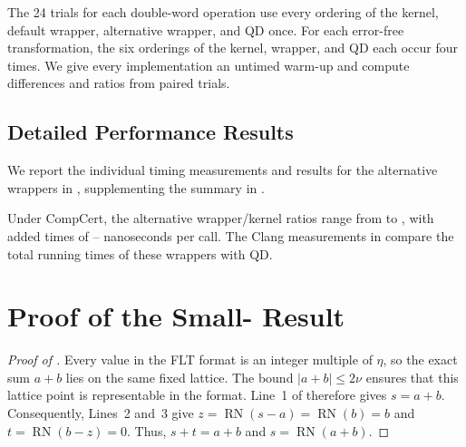The 24 trials for each double-word operation use every ordering of the kernel,
default wrapper, alternative wrapper, and QD once. For each error-free
transformation, the six orderings of the kernel, wrapper, and QD each occur
four times. We give every implementation an untimed warm-up and compute
differences and ratios from paired trials.

\subsection{Detailed Performance Results}

We report the individual timing measurements and results for the alternative
wrappers in , supplementing the summary in
.

Under CompCert, the alternative wrapper/kernel ratios range from
\RQThreeStrongMinimumKernelRatio{} to \RQThreeStrongMaximumKernelRatio{}, with
added times of \RQThreeStrongMinimumAddedTime{}--
\RQThreeStrongMaximumAddedTime{} nanoseconds per call. The Clang measurements
in  compare the total running times of these
wrappers with QD.

\section{Proof of the Small-\FastTwoSum{} Result}
\label{app:fast-two-sum-small-proof}

\begin{proof}[Proof of ]
Every value in the FLT format is an integer multiple of $\eta$, so the exact
sum $a+b$ lies on the same fixed lattice. The bound $|a+b|\leq2\nu$ ensures
that this lattice point is representable in the format. Line~1 of
 therefore gives $s=a+b$. Consequently, Lines~2 and~3
give $z=\operatorname{RN}(s-a)=\operatorname{RN}(b)=b$ and
$t=\operatorname{RN}(b-z)=0$. Thus, $s+t=a+b$ and
$s=\operatorname{RN}(a+b)$.
\end{proof}
